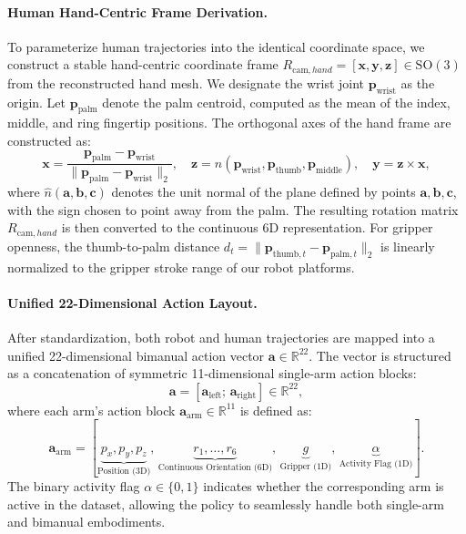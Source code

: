 \paragraph{Human Hand-Centric Frame Derivation.}
To parameterize human trajectories into the identical coordinate space, we construct a stable hand-centric coordinate frame $R_{\mathrm{cam}, hand} = [\mathbf{x}, \mathbf{y}, \mathbf{z}] \in \mathrm{SO}(3)$ from the reconstructed hand mesh. We designate the wrist joint $\mathbf{p}_{\mathrm{wrist}}$ as the origin. Let $\mathbf{p}_{\mathrm{palm}}$ denote the palm centroid, computed as the mean of the index, middle, and ring fingertip positions. The orthogonal axes of the hand frame are constructed as:
\begin{equation}
  \mathbf{x} = \frac{\mathbf{p}_{\mathrm{palm}} - \mathbf{p}_{\mathrm{wrist}}}{\|\mathbf{p}_{\mathrm{palm}} - \mathbf{p}_{\mathrm{wrist}}\|_2},
  \quad
  \mathbf{z} = \hat{n}(\mathbf{p}_{\mathrm{wrist}}, \mathbf{p}_{\mathrm{thumb}}, \mathbf{p}_{\mathrm{middle}}),
  \quad
  \mathbf{y} = \mathbf{z} \times \mathbf{x},
\end{equation}
where $\hat{n}(\mathbf{a},\mathbf{b},\mathbf{c})$ denotes the unit normal of the plane defined by points $\mathbf{a},\mathbf{b},\mathbf{c}$, with the sign chosen to point away from the palm. The resulting rotation matrix $R_{\mathrm{cam}, hand}$ is then converted to the continuous 6D representation. For gripper openness, the thumb-to-palm distance $d_t = \|\mathbf{p}_{\mathrm{thumb},t} - \mathbf{p}_{\mathrm{palm},t}\|_2$ is linearly normalized to the gripper stroke range of our robot platforms.

\paragraph{Unified 22-Dimensional Action Layout.}
After standardization, both robot and human trajectories are mapped into a unified 22-dimensional bimanual action vector $\mathbf{a} \in \mathbb{R}^{22}$. The vector is structured as a concatenation of symmetric 11-dimensional single-arm action blocks:
\begin{equation}
\mathbf{a} = \left[ \mathbf{a}_{\mathrm{left}};\, \mathbf{a}_{\mathrm{right}} \right] \in \mathbb{R}^{22},
\end{equation}
where each arm's action block $\mathbf{a}_{\mathrm{arm}} \in \mathbb{R}^{11}$ is defined as:
\begin{equation}
\mathbf{a}_{\mathrm{arm}} = \left[ \underbrace{p_x, p_y, p_z}_{\text{Position (3D)}}, \, \underbrace{r_1, \dots, r_6}_{\text{Continuous Orientation (6D)}}, \, \underbrace{g}_{\text{Gripper (1D)}}, \, \underbrace{\alpha}_{\text{Activity Flag (1D)}} \right].
\end{equation}
The binary activity flag $\alpha \in \{0, 1\}$ indicates whether the corresponding arm is active in the dataset, allowing the policy to seamlessly handle both single-arm and bimanual embodiments.

